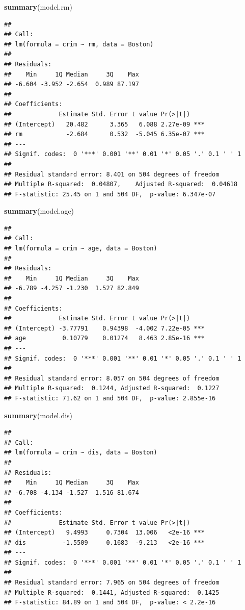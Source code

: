 \documentclass[]{article}
\newenvironment{Shaded}{\begin{snugshade}}{\end{snugshade}}
\newcommand{\KeywordTok}[1]{\textcolor[rgb]{0.13,0.29,0.53}{\textbf{#1}}}
\newcommand{\NormalTok}[1]{#1}
\begin{document}
\begin{Shaded}
\begin{Highlighting}[]
\KeywordTok{summary}\NormalTok{(model.rm)}
\end{Highlighting}
\end{Shaded}

\begin{verbatim}
## 
## Call:
## lm(formula = crim ~ rm, data = Boston)
## 
## Residuals:
##    Min     1Q Median     3Q    Max 
## -6.604 -3.952 -2.654  0.989 87.197 
## 
## Coefficients:
##             Estimate Std. Error t value Pr(>|t|)    
## (Intercept)   20.482      3.365   6.088 2.27e-09 ***
## rm            -2.684      0.532  -5.045 6.35e-07 ***
## ---
## Signif. codes:  0 '***' 0.001 '**' 0.01 '*' 0.05 '.' 0.1 ' ' 1
## 
## Residual standard error: 8.401 on 504 degrees of freedom
## Multiple R-squared:  0.04807,    Adjusted R-squared:  0.04618 
## F-statistic: 25.45 on 1 and 504 DF,  p-value: 6.347e-07
\end{verbatim}

\begin{Shaded}
\begin{Highlighting}[]
\KeywordTok{summary}\NormalTok{(model.age)}
\end{Highlighting}
\end{Shaded}

\begin{verbatim}
## 
## Call:
## lm(formula = crim ~ age, data = Boston)
## 
## Residuals:
##    Min     1Q Median     3Q    Max 
## -6.789 -4.257 -1.230  1.527 82.849 
## 
## Coefficients:
##             Estimate Std. Error t value Pr(>|t|)    
## (Intercept) -3.77791    0.94398  -4.002 7.22e-05 ***
## age          0.10779    0.01274   8.463 2.85e-16 ***
## ---
## Signif. codes:  0 '***' 0.001 '**' 0.01 '*' 0.05 '.' 0.1 ' ' 1
## 
## Residual standard error: 8.057 on 504 degrees of freedom
## Multiple R-squared:  0.1244, Adjusted R-squared:  0.1227 
## F-statistic: 71.62 on 1 and 504 DF,  p-value: 2.855e-16
\end{verbatim}

\begin{Shaded}
\begin{Highlighting}[]
\KeywordTok{summary}\NormalTok{(model.dis)}
\end{Highlighting}
\end{Shaded}

\begin{verbatim}
## 
## Call:
## lm(formula = crim ~ dis, data = Boston)
## 
## Residuals:
##    Min     1Q Median     3Q    Max 
## -6.708 -4.134 -1.527  1.516 81.674 
## 
## Coefficients:
##             Estimate Std. Error t value Pr(>|t|)    
## (Intercept)   9.4993     0.7304  13.006   <2e-16 ***
## dis          -1.5509     0.1683  -9.213   <2e-16 ***
## ---
## Signif. codes:  0 '***' 0.001 '**' 0.01 '*' 0.05 '.' 0.1 ' ' 1
## 
## Residual standard error: 7.965 on 504 degrees of freedom
## Multiple R-squared:  0.1441, Adjusted R-squared:  0.1425 
## F-statistic: 84.89 on 1 and 504 DF,  p-value: < 2.2e-16
\end{verbatim}
\end{document}
